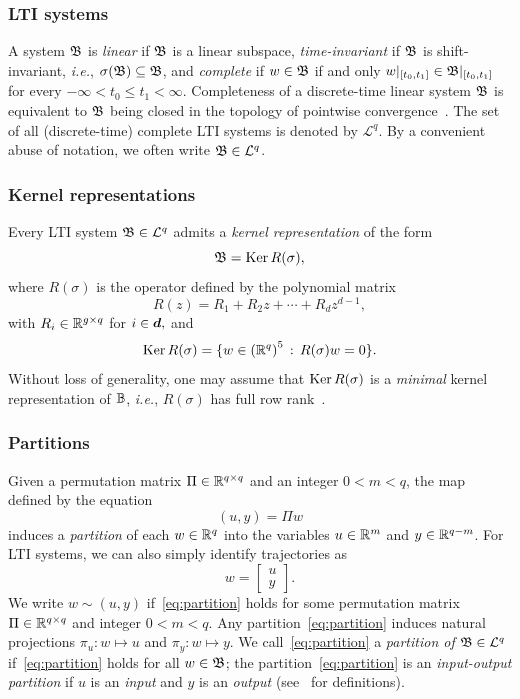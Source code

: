  \subsubsection{LTI systems}
 A system $\mathfrak{B}$ is \textit{linear} if $\mathfrak{B}$ is a linear subspace, \textit{time-invariant} if $\mathfrak{B}$ is shift-invariant, \textit{i.e.}, ${\sigma(\mathfrak{B}) \subseteq \mathfrak{B}}$, and \textit{complete} if ${w\in\mathfrak{B}}$ if and only ${w|_{[t_0,t_1]} \in \mathfrak{B}|_{[t_0,t_1]}}$ for every ${-\infty < t_0 \le t_1 < \infty}$. Completeness of a discrete-time linear system $\mathfrak{B}$ is equivalent  to $\mathfrak{B}$ being closed in the topology of pointwise convergence~\cite[Proposition 4]{willems1986}. The set of all (discrete-time) complete LTI systems is denoted by $\mathcal{L}^q$.  By a convenient abuse of notation, we often write $\mathfrak{B} \in \mathcal{L}^{q}$.


 \subsubsection{Kernel representations}
 Every LTI system ${\mathfrak{B} \in \mathcal{L}^{q}}$ admits a \textit{kernel representation} of the form
 \begin{equation}
 \mathfrak{B} = \operatorname{Ker} R(\sigma) ,
 \end{equation}
 where  $R(\sigma)$ is the operator defined by the polynomial matrix 
\[
R(z) = R_1 + R_2 z + \cdots + R_{d}z^{d-1},
\]
 with $R_i\in\mathbb{R}^{g\times q}$ for $i\in\text{\boldmath$d$\unboldmath},$ and 
 \[
   \operatorname{Ker} R(\sigma) = \{w\in{(\mathbb{R}^q)}^5 \,:\, R(\sigma)w = 0\}.
 \]
 Without loss of generality, one may assume that  $\operatorname{Ker} R(\sigma)$  is a \emph{minimal}  kernel representation of $\mathbb{B}$,  \textit{i.e.},  $R(\sigma)$ has full row rank~\cite{willems1989}.


 \subsubsection{Partitions}
 Given a permutation matrix ${\Pi\in\mathbb{R}^{q\times q}}$ and an integer $0 < m < q$, the map defined by the equation
 \begin{equation} \label{eq:partition} 
 (u,y) = \Pi w 
 \end{equation}
 induces a \textit{partition} of each ${w\in\mathbb{R}^q}$ into the variables ${u\in\mathbb{R}^m}$ and ${y\in\mathbb{R}^{q-m}}$.  For LTI systems, we can also simply identify trajectories as 
 \begin{equation} \label{eq:partition_lti}
   w = \begin{bmatrix}
      u \\
      y
   \end{bmatrix}.
 \end{equation}
 We write $w \sim (u,y)$ if~\eqref{eq:partition} holds for some  permutation matrix ${\Pi\in\mathbb{R}^{q\times q}}$ and integer ${0 < m < q}$.  
 Any partition~\eqref{eq:partition} induces natural  projections  ${ \pi_u:  w \mapsto u}$ and ${ \pi_y:  w \mapsto y}$. We call~\eqref{eq:partition} a \textit{partition of ${\mathfrak{B}\in\mathcal{L}^{q}}$} if~\eqref{eq:partition} holds for all ${w\in\mathfrak{B}}$; the partition~\eqref{eq:partition} is an \textit{input-output partition} if $u$ is an \textit{input} and $y$ is an \textit{output} (see~\cite[p.568]{willems1986} for definitions).

